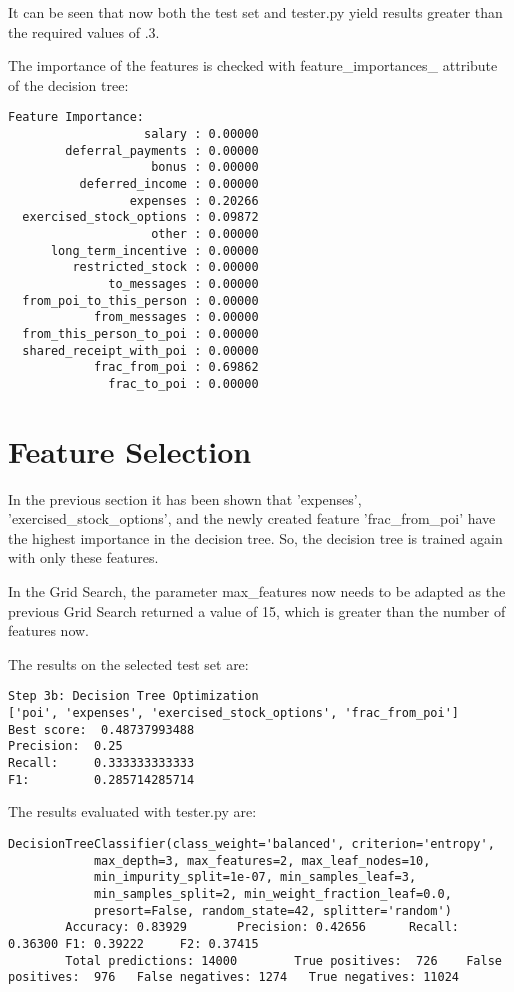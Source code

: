 \documentclass[11pt]{article} %
\begin{document}
It can be seen that now both the test set and tester.py yield results greater than the required values of .3.\medskip

The importance of the features is checked with {\selectfont feature\_importances\_} attribute of the decision tree:
\begin{verbatim}
Feature Importance: 
                   salary : 0.00000
        deferral_payments : 0.00000
                    bonus : 0.00000
          deferred_income : 0.00000
                 expenses : 0.20266
  exercised_stock_options : 0.09872
                    other : 0.00000
      long_term_incentive : 0.00000
         restricted_stock : 0.00000
              to_messages : 0.00000
  from_poi_to_this_person : 0.00000
            from_messages : 0.00000
  from_this_person_to_poi : 0.00000
  shared_receipt_with_poi : 0.00000
            frac_from_poi : 0.69862
              frac_to_poi : 0.00000
\end{verbatim}

\section{Feature Selection}

In the previous section it has been shown that 'expenses', 'exercised\_stock\_options', and the newly created feature 'frac\_from\_poi' have the highest importance in the decision tree. So, the decision tree is trained again with only these features. \medskip

In the Grid Search, the parameter {\selectfont max\_features} now needs to be adapted as the previous Grid Search returned a value of 15, which is greater than the number of features now.\medskip

The results on the selected test set are:
\begin{verbatim}
Step 3b: Decision Tree Optimization
['poi', 'expenses', 'exercised_stock_options', 'frac_from_poi']
Best score:  0.48737993488
Precision:  0.25
Recall:     0.333333333333
F1:         0.285714285714
\end{verbatim}

The results evaluated with tester.py are:
{\tiny
\begin{verbatim}
DecisionTreeClassifier(class_weight='balanced', criterion='entropy',
            max_depth=3, max_features=2, max_leaf_nodes=10,
            min_impurity_split=1e-07, min_samples_leaf=3,
            min_samples_split=2, min_weight_fraction_leaf=0.0,
            presort=False, random_state=42, splitter='random')
        Accuracy: 0.83929       Precision: 0.42656      Recall: 0.36300 F1: 0.39222     F2: 0.37415
        Total predictions: 14000        True positives:  726    False positives:  976   False negatives: 1274   True negatives: 11024
\end{verbatim}
}
\end{document}
